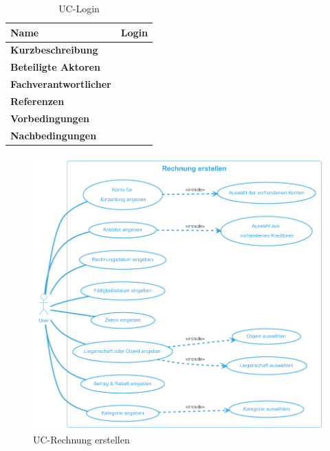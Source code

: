 \begin{table}[H]
  \centering
  \settowidth{}
  \setlength\extrarowheight{2pt}
  \begin{tabulary}{1.0\textwidth}{|a|m{12cm}|}
    \hline
    \textbf{Name}& Login\\
    \hline 
    \textbf{Kurzbeschreibung} & \\
    \hline
    \textbf{Beteiligte Aktoren} & \\
    \hline
    \textbf{Fachverantwortlicher} & \\
    \hline
    \textbf{Referenzen} & \\
    \hline
    \textbf{Vorbedingungen} & \\
    \hline
    \textbf{Nachbedingungen} & \\
    \hline
  \end{tabulary}
  \caption{UC-Login}
\end{table}

\begin{figure}[H]
  \begin{center}
    \includegraphics[width=0.8\linewidth]{content/diagrams/out/usecase/rechnungErstellen/Rechnung erstellen.png}
    \caption{UC-Rechnung erstellen}
  \end{center}
  \label{RechnungErstellen}
\end{figure}

